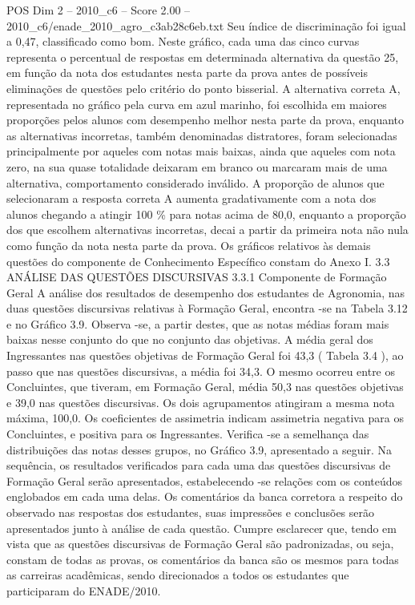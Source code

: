 \begin{textsample}{POS Dim 2 – 2010\_c6 – Score 2.00 – 2010\_c6/enade\_2010\_agro\_c3ab28c6eb.txt}
Seu índice de discriminação foi igual a 0,47, classificado como bom.
Neste gráfico, cada uma das cinco curvas representa o percentual de respostas em determinada alternativa da questão 25, em função da nota dos estudantes nesta parte da prova antes de possíveis eliminações de questões pelo critério do ponto bisserial.
A alternativa correta A, representada no gráfico pela curva em azul marinho, foi escolhida em maiores proporções pelos alunos com desempenho melhor nesta parte da prova, enquanto as alternativas incorretas, também denominadas distratores, foram selecionadas principalmente por aqueles com notas mais baixas, ainda que aqueles com nota zero, na sua quase totalidade deixaram em branco ou marcaram mais de uma alternativa, comportamento considerado inválido.
A proporção de alunos que selecionaram a resposta correta A aumenta gradativamente com a nota dos alunos chegando a atingir 100 \% para notas acima de 80,0, enquanto a proporção dos que escolhem alternativas incorretas, decai a partir da primeira nota não nula como função da nota nesta parte da prova.
Os gráficos relativos às demais questões do componente de Conhecimento Específico constam do Anexo I. 3.3 ANÁLISE DAS QUESTÕES DISCURSIVAS 3.3.1 Componente de Formação Geral A análise dos resultados de desempenho dos estudantes de Agronomia, nas duas questões discursivas relativas à Formação Geral, encontra -se na Tabela 3.12 e no Gráfico 3.9.
Observa -se, a partir destes, que as notas médias foram mais baixas nesse conjunto do que no conjunto das objetivas.
A média geral dos Ingressantes nas questões objetivas de Formação Geral foi 43,3 ( Tabela 3.4 ), ao passo que nas questões discursivas, a média foi 34,3.
O mesmo ocorreu entre os Concluintes, que tiveram, em Formação Geral, média 50,3 nas questões objetivas e 39,0 nas questões discursivas.
Os dois agrupamentos atingiram a mesma nota máxima, 100,0.
Os coeficientes de assimetria indicam assimetria negativa para os Concluintes, e positiva para os Ingressantes.
Verifica -se a semelhança das distribuições das notas desses grupos, no Gráfico 3.9, apresentado a seguir.
Na sequência, os resultados verificados para cada uma das questões discursivas de Formação Geral serão apresentados, estabelecendo -se relações com os conteúdos englobados em cada uma delas.
Os comentários da banca corretora a respeito do observado nas respostas dos estudantes, suas impressões e conclusões serão apresentados junto à análise de cada questão.
Cumpre esclarecer que, tendo em vista que as questões discursivas de Formação Geral são padronizadas, ou seja, constam de todas as provas, os comentários da banca são os mesmos para todas as carreiras acadêmicas, sendo direcionados a todos os estudantes que participaram do ENADE/2010.

\end{textsample}
